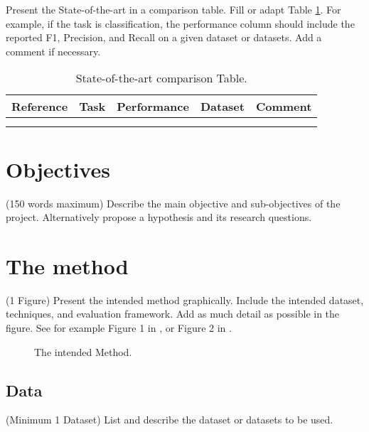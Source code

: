 \documentclass[11pt,a4paper]{article}
\begin{document}
Present the State-of-the-art in a comparison table. Fill or adapt Table \ref{table:1}. For example, if the task is classification, the performance column should include the reported F1, Precision, and Recall on a given dataset or datasets. Add a comment if necessary.

\begin{table}[]
\centering
\begin{tabular}{|l|l|l|l|l|}
\hline
\textbf{Reference} & \textbf{Task} & \textbf{Performance} & \textbf{Dataset} & \textbf{Comment} \\ \hline
                   &               &                      &                  &                  \\ \hline
                   &               &                      &                  &                  \\ \hline
\end{tabular}
\caption{State-of-the-art comparison Table.}
\label{table:1}

\end{table}

\section{Objectives}
({\color{blue}150 words maximum}) Describe the main objective and sub-objectives of the project. Alternatively propose a hypothesis and its research questions. 

\section{The method}
({\color{blue}1 Figure}) Present the intended method graphically. Include the intended dataset, techniques, and evaluation framework. Add as much detail as possible in the figure. See for example Figure 1 in , or Figure 2 in .

\begin{figure}[h]
	\centering
	\caption[The intended Method]{The intended Method. }
	\label{fig:2}
\end{figure}


\subsection{Data}
({\color{blue}Minimum 1 Dataset}) List and describe the dataset or datasets to be used.
\end{document}

